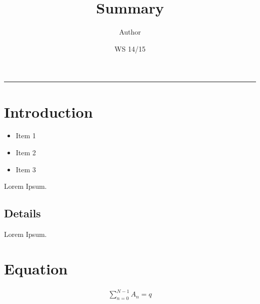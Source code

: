 \documentclass[11pt, oneside]{article}   	%
\title{Summary}
\author{Author}
\date{WS 14/15}							%
\begin{document}
\twocolumn
\maketitle
\tableofcontents
\noindent\rule{0.5\textwidth}{0.5pt}

\section{Introduction}
\begin{itemize}
	\item Item 1
	\item Item 2
	\item Item 3 
\end{itemize}
Lorem Ipsum.
\subsection{Details}
Lorem Ipsum.
\section{Equation}
\begin{align}
	\sum_{n=0}^{N-1} A_n = q
\end{align}
\end{document}
